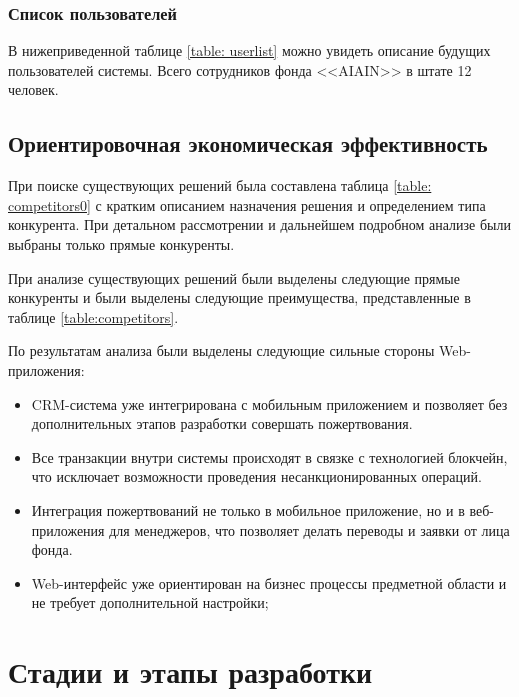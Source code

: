 \documentclass[a4paper,12pt,reqno]{article}
\begin{document}
\subsubsection{Список пользователей} \label{sec: listusers}

В нижеприведенной таблице \ref{table: userlist} можно увидеть описание будущих пользователей системы. Всего сотрудников фонда <<AIAIN>> в штате 12 человек.

	\subsection{Ориентировочная экономическая эффективность} 
	
	При поиске существующих решений была составлена таблица \ref{table: competitors0} с кратким описанием назначения решения и определением типа конкурента. При детальном рассмотрении и дальнейшем подробном анализе были выбраны только прямые конкуренты.
	
	

	При анализе существующих решений были выделены следующие прямые конкуренты и были выделены следующие преимущества, представленные в таблице \ref{table:competitors}. 
	
	
	
	По результатам анализа были выделены следующие сильные стороны Web-приложения:
\begin{itemize}
    \item  CRM-система уже интегрирована с мобильным приложением и позволяет без дополнительных этапов разработки совершать пожертвования.
    \item Все транзакции внутри системы происходят в связке с технологией блокчейн, что исключает возможности проведения несанкционированных операций.
    \item Интеграция пожертвований не только в мобильное приложение, но и в веб-приложения для менеджеров, что позволяет делать переводы и заявки от лица фонда.
    \item Web-интерфейс уже ориентирован на бизнес процессы предметной области и не требует дополнительной настройки;
\end{itemize} 


	
	
						\newpage
	\section{Стадии и этапы разработки}
	
\end{document}
